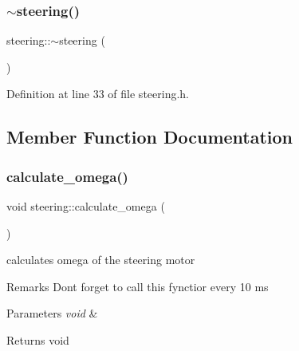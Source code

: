 \mbox{\label{classsteering_a9b686e0fb626c3e8dd16ee5106a842b7}} 
\subsubsection{\texorpdfstring{$\sim$steering()}{~steering()}}
{\footnotesize\ttfamily steering\+::$\sim$steering (\begin{DoxyParamCaption}{ }\end{DoxyParamCaption})\hspace{0.3cm}{\ttfamily [inline]}}



Definition at line 33 of file steering.\+h.



\subsection{Member Function Documentation}
\mbox{\label{classsteering_ae5a6bb4e5cb24e22d75723d0f8f10295}} 
\subsubsection{\texorpdfstring{calculate\_omega()}{calculate\_omega()}}
{\footnotesize\ttfamily void steering\+::calculate\+\_\+omega (\begin{DoxyParamCaption}\item[{void}]{ }\end{DoxyParamCaption})\hspace{0.3cm}{\ttfamily [inline]}}



calculates omega of the steering motor 

\begin{DoxyRemark}{Remarks}
Dont forget to call this fynctior every 10 ms 
\end{DoxyRemark}

\begin{DoxyParams}{Parameters}
{\em void} & \\
\hline
\end{DoxyParams}
\begin{DoxyReturn}{Returns}
void 
\end{DoxyReturn}


